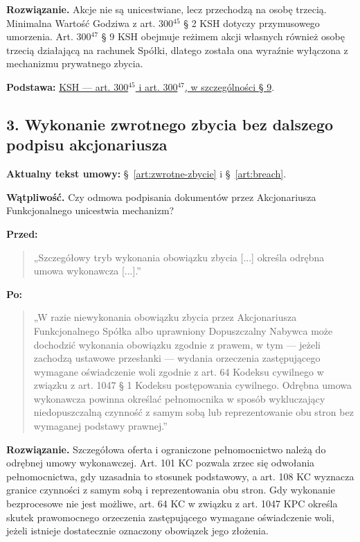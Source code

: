 \documentclass[12pt,a4paper]{report}
\begin{document}
\textbf{Rozwiązanie.} Akcje nie są unicestwiane, lecz przechodzą na osobę trzecią. Minimalna Wartość Godziwa z art. 300$^{45}$ § 2 KSH dotyczy przymusowego umorzenia. Art. 300$^{47}$ § 9 KSH obejmuje reżimem akcji własnych również osobę trzecią działającą na rachunek Spółki, dlatego została ona wyraźnie wyłączona z mechanizmu prywatnego zbycia.

\textbf{Podstawa:} \href{https://eli.gov.pl/api/acts/DU/2024/18/text.html}{KSH --- art. 300$^{45}$ i art. 300$^{47}$, w szczególności § 9}.

\subsection*{3. Wykonanie zwrotnego zbycia bez dalszego podpisu akcjonariusza}
\textbf{Aktualny tekst umowy:} §~\ref{art:zwrotne-zbycie} i §~\ref{art:breach}.

\textbf{Wątpliwość.} Czy odmowa podpisania dokumentów przez Akcjonariusza Funkcjonalnego unicestwia mechanizm?

\textbf{Przed:}
\begin{quote}\small
„Szczegółowy tryb wykonania obowiązku zbycia [...] określa odrębna umowa wykonawcza [...].”
\end{quote}

\textbf{Po:}
\begin{quote}\small
„W razie niewykonania obowiązku zbycia przez Akcjonariusza Funkcjonalnego Spółka albo uprawniony Dopuszczalny Nabywca może dochodzić wykonania obowiązku zgodnie z prawem, w tym --- jeżeli zachodzą ustawowe przesłanki --- wydania orzeczenia zastępującego wymagane oświadczenie woli zgodnie z art. 64 Kodeksu cywilnego w związku z art. 1047 § 1 Kodeksu postępowania cywilnego. Odrębna umowa wykonawcza powinna określać pełnomocnika w sposób wykluczający niedopuszczalną czynność z samym sobą lub reprezentowanie obu stron bez wymaganej podstawy prawnej.”
\end{quote}

\textbf{Rozwiązanie.} Szczegółowa oferta i ograniczone pełnomocnictwo należą do odrębnej umowy wykonawczej. Art. 101 KC pozwala zrzec się odwołania pełnomocnictwa, gdy uzasadnia to stosunek podstawowy, a art. 108 KC wyznacza granice czynności z samym sobą i reprezentowania obu stron. Gdy wykonanie bezprocesowe nie jest możliwe, art. 64 KC w związku z art. 1047 KPC określa skutek prawomocnego orzeczenia zastępującego wymagane oświadczenie woli, jeżeli istnieje dostatecznie oznaczony obowiązek jego złożenia.
\end{document}
